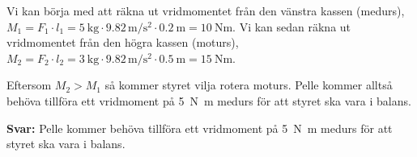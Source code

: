 \documentclass[11pt]{article}
\begin{document}
\begin{enumerate}[itemsep=2em]
              Vi kan börja med att räkna ut vridmomentet från den vänstra kassen (medurs), $M_1 = F_1 \cdot l_1 = \SI{5}{\kilogram} \cdot 9.82 \, \si{\meter/\second\squared} \cdot \SI{0.2}{\meter} = \SI{10}{\newton\metre}$. Vi kan sedan räkna ut vridmomentet från den högra kassen (moturs), $M_2 = F_2 \cdot l_2 = \SI{3}{\kilogram} \cdot 9.82 \, \si{\meter/\second\squared} \cdot \SI{0.5}{\metre} = \SI{15}{\newton\meter}$.

              Eftersom $M_2 > M_1$ så kommer styret vilja rotera moturs. Pelle kommer alltså behöva tillföra ett vridmoment på \SI{5}{\newton\metre} medurs för att styret ska vara i balans.

              \textbf{Svar:} Pelle kommer behöva tillföra ett vridmoment på \SI{5}{\newton\metre} medurs för att styret ska vara i balans.


\end{enumerate}
\end{document}
